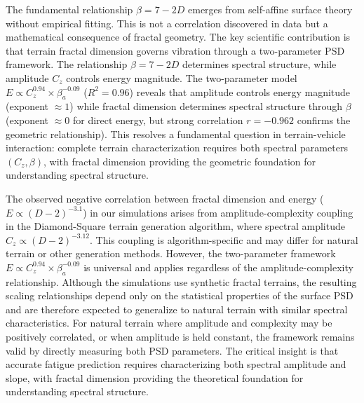 \documentclass[11pt,letterpaper]{article}
\begin{document}
The fundamental relationship $\beta = 7-2D$ emerges from self-affine surface theory without empirical fitting\cite{Mandelbrot1982,Turcotte1997}. This is not a correlation discovered in data but a mathematical consequence of fractal geometry. The key scientific contribution is that terrain fractal dimension governs vibration through a two-parameter PSD framework. The relationship $\beta = 7-2D$ determines spectral structure, while amplitude $C_z$ controls energy magnitude. The two-parameter model $E \propto C_z^{0.94} \times \beta_a^{-0.09}$ ($R^2 = 0.96$) reveals that amplitude controls energy magnitude (exponent $\approx 1$) while fractal dimension determines spectral structure through $\beta$ (exponent $\approx 0$ for direct energy, but strong correlation $r=-0.962$ confirms the geometric relationship). This resolves a fundamental question in terrain-vehicle interaction: complete terrain characterization requires both spectral parameters $(C_z, \beta)$, with fractal dimension providing the geometric foundation for understanding spectral structure.

The observed negative correlation between fractal dimension and energy ($E \propto (D-2)^{-3.1}$) in our simulations arises from amplitude-complexity coupling in the Diamond-Square terrain generation algorithm, where spectral amplitude $C_z \propto (D-2)^{-3.12}$. This coupling is algorithm-specific and may differ for natural terrain or other generation methods. However, the two-parameter framework $E \propto C_z^{0.94} \times \beta_a^{-0.09}$ is universal and applies regardless of the amplitude-complexity relationship. Although the simulations use synthetic fractal terrains, the resulting scaling relationships depend only on the statistical properties of the surface PSD and are therefore expected to generalize to natural terrain with similar spectral characteristics. For natural terrain where amplitude and complexity may be positively correlated, or when amplitude is held constant, the framework remains valid by directly measuring both PSD parameters. The critical insight is that accurate fatigue prediction requires characterizing both spectral amplitude and slope, with fractal dimension providing the theoretical foundation for understanding spectral structure.
\end{document}
